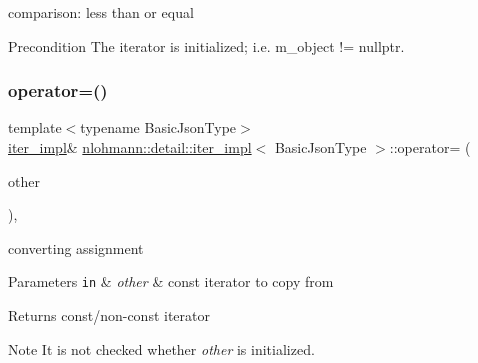 comparison\+: less than or equal 

\begin{DoxyPrecond}{Precondition}
The iterator is initialized; i.\+e. {\ttfamily m\+\_\+object != nullptr}. 
\end{DoxyPrecond}
\mbox{\label{classnlohmann_1_1detail_1_1iter__impl_a9a5cd7864a8f848ef107d3f5a330f5e7}} 
\subsubsection{\texorpdfstring{operator=()}{operator=()}\hspace{0.1cm}{\footnotesize\ttfamily [1/2]}}
{\footnotesize\ttfamily template$<$typename Basic\+Json\+Type$>$ \\
\mbox{\hyperlink{classnlohmann_1_1detail_1_1iter__impl}{iter\+\_\+impl}}\& \mbox{\hyperlink{classnlohmann_1_1detail_1_1iter__impl}{nlohmann\+::detail\+::iter\+\_\+impl}}$<$ Basic\+Json\+Type $>$\+::operator= (\begin{DoxyParamCaption}\item[{const \mbox{\hyperlink{classnlohmann_1_1detail_1_1iter__impl}{iter\+\_\+impl}}$<$ const Basic\+Json\+Type $>$ \&}]{other }\end{DoxyParamCaption})\hspace{0.3cm}{\ttfamily [inline]}, {\ttfamily [noexcept]}}



converting assignment 


\begin{DoxyParams}[1]{Parameters}
\mbox{\tt in}  & {\em other} & const iterator to copy from \\
\hline
\end{DoxyParams}
\begin{DoxyReturn}{Returns}
const/non-\/const iterator 
\end{DoxyReturn}
\begin{DoxyNote}{Note}
It is not checked whether {\itshape other} is initialized. 
\end{DoxyNote}
\mbox{\label{classnlohmann_1_1detail_1_1iter__impl_a7159ed1cfe7c423a2baef8bea0c94509}} 
